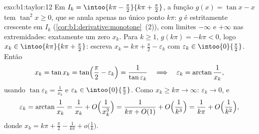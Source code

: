 \begin{solution}{exo:b1:taylor:12}
Em $I_k = \intoo{k\pi - \frac\pi2}{k\pi + \frac\pi2}$, a
função $g(x) = \tan x - x$ tem  $\tan^2 x \geq 0$,
que se anula apenas no único ponto $k\pi$: $g$ é estritamente
crescente em $I_k$ (\cref{cor:b1:derivative:monotone}~(2)),
com limites $-\infty$ e $+\infty$ nas extremidades: exatamente um
zero $x_k$. Para $k \geq 1$, $g(k\pi) = -k\pi < 0$, logo $x_k \in
\intoo{k\pi}{k\pi + \frac\pi2}$: escreva $x_k = k\pi + \frac\pi2 -
\varepsilon_k$ com $\varepsilon_k \in \intoo{0}{\frac\pi2}$.
Então
\[
x_k = \tan x_k = \tan\Bigl(\frac\pi2 - \varepsilon_k\Bigr)
= \frac{1}{\tan\varepsilon_k}
\quad\Longrightarrow\quad
\varepsilon_k = \arctan\frac{1}{x_k} ,
\]
usando $\tan\varepsilon_k = \frac{1}{x_k}$ e $\varepsilon_k \in
\intoo{0}{\frac\pi2}$. Como $x_k \geq k\pi \to \infty$:
$\varepsilon_k \to 0$, e
\[
\varepsilon_k = \arctan\frac{1}{x_k} = \frac{1}{x_k} +
O\Bigl(\frac{1}{x_k^3}\Bigr)
= \frac{1}{k\pi + O(1)} + O\Bigl(\frac{1}{k^3}\Bigr)
= \frac{1}{k\pi} + O\Bigl(\frac{1}{k^2}\Bigr) ,
\]
donde $x_k = k\pi + \frac\pi2 - \frac{1}{k\pi} +
o\bigl(\frac1k\bigr)$.
\end{solution}

